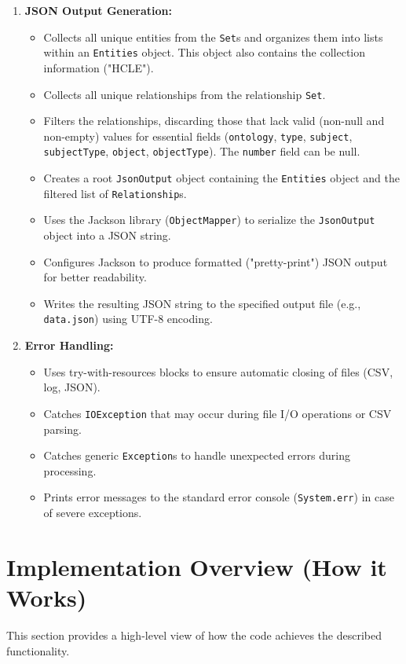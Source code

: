 \documentclass[11pt, a4paper]{article}
\begin{document}
\begin{enumerate}
    \item \textbf{JSON Output Generation:}
        \begin{itemize}
            \item Collects all unique entities from the \texttt{Set}s and organizes them into lists within an \texttt{Entities} object. This object also contains the collection information ("HCLE").
            \item Collects all unique relationships from the relationship \texttt{Set}.
            \item Filters the relationships, discarding those that lack valid (non-null and non-empty) values for essential fields (\texttt{ontology}, \texttt{type}, \texttt{subject}, \texttt{subjectType}, \texttt{object}, \texttt{objectType}). The \texttt{number} field can be null.
            \item Creates a root \texttt{JsonOutput} object containing the \texttt{Entities} object and the filtered list of \texttt{Relationship}s.
            \item Uses the Jackson library (\texttt{ObjectMapper}) to serialize the \texttt{JsonOutput} object into a JSON string.
            \item Configures Jackson to produce formatted ("pretty-print") JSON output for better readability.
            \item Writes the resulting JSON string to the specified output file (e.g., \texttt{data.json}) using UTF-8 encoding.
        \end{itemize}

    \item \textbf{Error Handling:}
        \begin{itemize}
            \item Uses try-with-resources blocks to ensure automatic closing of files (CSV, log, JSON).
            \item Catches \texttt{IOException} that may occur during file I/O operations or CSV parsing.
            \item Catches generic \texttt{Exception}s to handle unexpected errors during processing.
            \item Prints error messages to the standard error console (\texttt{System.err}) in case of severe exceptions.
        \end{itemize}
\end{enumerate}

\section{Implementation Overview (How it Works)}
This section provides a high-level view of how the code achieves the described functionality.
\end{document}
